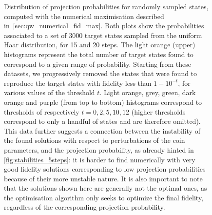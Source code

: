 \begin{figure}[]
    \centering
    \begin{minipage}[b]{0.5\textwidth}
    \end{minipage}%
    \begin{minipage}[b]{0.5\textwidth}
    \end{minipage}
    \caption{
        Distribution of projection probabilities for randomly sampled states, computed with the numerical maximisation described in~\cref{sec:qw_numerical_fid_max}.
        Both plots show the probabilities associated to a set of 3000 target states sampled from the uniform Haar distribution, for 15 and 20 steps.
        The light orange (upper) histograms represent the total number of target states found to correspond to a given range of probability.
        Starting from these datasets, we progressively removed the states that were found to reproduce the target states with fidelity less than $1 - 10^{-t}$, for various values of the threshold $t$.
        Light orange, grey, green, dark orange and purple (from top to bottom) histograms correspond to thresholds of respectively $t = 0, 2, 5, 10, 12$ (higher thresholds correspond to only a handful of states and are therefore omitted).
        This data further suggests a connection between the instability of the found solutions with respect to perturbations of the coin parameters, and the projection probability, as already hinted in \cref{fig:stabilities_5steps}:
        it is harder to find numerically with very good fidelity solutions corresponding to low projection probabilities because of their more unstable nature.
        It is also important to note that the solutions shown here are generally not the optimal ones,
        as the optimisation algorithm only seeks to optimize the final fidelity,
        regardless of the corresponding projection probability.
    }
    \label{fig:prob_histograms_nmaximize}
\end{figure}

